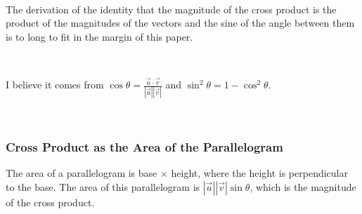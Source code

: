 \

The derivation of the identity that the magnitude of the cross product is the product of the magnitudes of the vectors and the sine of the angle between them is to long to fit in the margin of this paper.  

\

I believe it comes from $\displaystyle \cos \theta = \frac{\vec{u} \cdot \vec{v}}{|\vec{u}| |\vec{v}|}$ and $\sin^2 \theta = 1 - \cos^2 \theta$.  

\

\subsubsection{Cross Product as the Area of the Parallelogram}

The area of a parallelogram is base $\times$ height, where the height is perpendicular to the base.  The area of this parallelogram is $|\vec{u}| |\vec{v}| \sin \theta$, which is the magnitude of the cross product.  

\

\hfil{}

